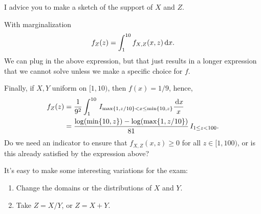 \documentclass[lectures]{subfiles}
\begin{document}
\begin{exercise}
\begin{solution}
I advice you to make a sketch of the support of $X$ and $Z$.


With marginalization
\begin{equation}
f_{Z}(z) =
\int_{1}^{10} f_{X,Z}(x,z) \,\textrm{d}x.
\end{equation}
We can plug in the above expression, but that just results in a longer expression that we cannot solve unless we make a specific choice for $f$.

Finally, if $X,Y$ uniform on $[1,10)$, then $f(x)=1/9$, hence,
\begin{align}
f_{Z}(z)
&=\frac{1}{9^{2}}\int_{1}^{10}  \,I_{\max\{1, z/10\}< x \leq \min\{10, z\}} \frac{\,\textrm{d}x}{x}\\
&=\frac{\log(\min\{10, z\}) - \log(\max\{1, z/10\})}{81} \,I_{1\leq z < 100}.
\end{align}
Do we need an indicator to ensure that $f_{X,Z}(x,z)\geq0$ for all $z \in [1, 100)$, or is this already satisfied by the expression above?

It's easy to make some interesting variations for the exam:
\begin{enumerate}
\item Change the domains or the distributions of $X$ and $Y$.
\item Take $Z=X/Y$, or $Z=X+Y$.
\end{enumerate}

\end{solution}
\end{exercise}
\end{document}
